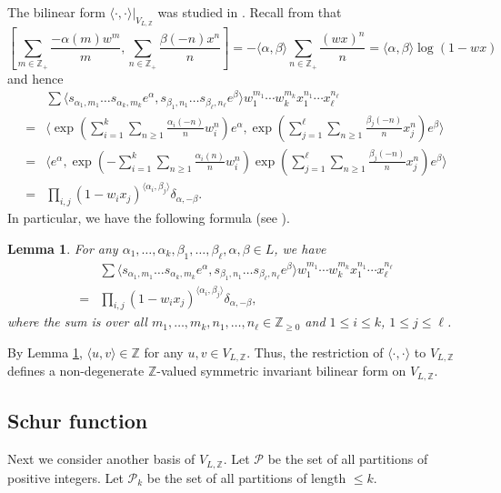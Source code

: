 \documentclass[12pt]{article}
\def\ZZ{{\mathbb Z}}
\newtheorem{lem}[thm]{Lemma}
\begin{document}
The bilinear form $\langle \cdot, \cdot\rangle|_{V_{L,\ZZ}}$ was studied in \cite{ivoa}. 
Recall from \cite[page 93]{FLM} that 
\[ 
\left[ \sum_{m\in \ZZ_+} \frac{-\alpha(m)w^m}{m}, 
\sum_{n\in \ZZ_+} \frac{\beta(-n)x^{n}}{n}\right] = -\langle \alpha, \beta\rangle
\sum_{n\in \ZZ_+}\frac{(wx)^n}{n} = \langle \alpha, \beta\rangle \log(1-wx)
\]
and hence 
\[
\begin{split}
&\sum\langle s_{\alpha_1,m_1} \dots s_{\alpha_k,m_k}e^\alpha, s_{\beta_1,n_1} \dots s_{\beta_\ell,n_\ell}e^\beta \rangle 
w_1^{m_1}\cdots w_k^{m_k} x_1^{n_1} \cdots x_\ell^{n_{\ell}}\\
= &
\langle \exp\left(
\sum_{i=1}^k \sum_{n\geq 1} \frac{\alpha_i(-n)}{n} w_i^n \right) e^\alpha, 
\exp\left(\sum_{j=1}^\ell \sum_{n\geq 1} \frac{\beta_j(-n)}{n} x_j^n \right ) e^{\beta}\rangle\\
=& 
\langle  e^\alpha, 
\exp\left(-
\sum_{i=1}^k \sum_{n\geq 1} \frac{\alpha_i(n)}{n} w_i^n \right)\exp\left(\sum_{j=1}^\ell \sum_{n\geq 1} \frac{\beta_j(-n)}{n} x_j^n \right ) e^{\beta}\rangle\\
=& \prod_{i,j} (1-w_ix_j)^{\langle \alpha_i, \beta_j \rangle}\delta_{\alpha,-\beta}. 
\end{split}
\]
In particular, we have the following formula (see \cite[(3.1)]{ivoa}). 
\begin{lem}\label{innerprod}
For any $\alpha_1,\dots, \alpha_k, \beta_1, \dots, \beta_\ell, \alpha, \beta \in L$, we have 
\begin{equation*} %
	\begin{split}
& \sum\langle s_{\alpha_1,m_1} \dots s_{\alpha_k,m_k}e^\alpha, s_{\beta_1,n_1} \dots s_{\beta_\ell,n_\ell}e^\beta \rangle 
w_1^{m_1}\cdots w_k^{m_k} x_1^{n_1} \cdots x_\ell^{n_{\ell}}\\
=  &\prod_{i,j} (1-w_ix_j)^{\langle \alpha_i, \beta_j \rangle}\delta_{\alpha,-\beta}, 
\end{split}
\end{equation*}
where the sum is over all $m_1, \dots, m_k,n_1,\dots, n_\ell \in \ZZ_{\geq 0}$ and  $ 1\leq i\leq  k$, $ 1 \leq j \leq \ell$.  
\end{lem}




By Lemma \ref{innerprod}, $\langle u,v\rangle \in \ZZ$ for any $u,v\in V_{L, \ZZ}$. Thus, the restriction 
of $\langle \cdot, \cdot \rangle$ to $V_{L,\ZZ}$ defines  a non-degenerate $\ZZ$-valued  symmetric invariant bilinear form on $V_{L, \ZZ}$.  


\subsection{Schur function} \label{sec3.1}  
Next we consider another basis of $V_{L,\ZZ}$.  
Let $\mathcal{P}$ be the set of all partitions of positive integers. Let 
$\mathcal{P}_k$ be the set of all partitions of length $\leq k$.  
\end{document}

